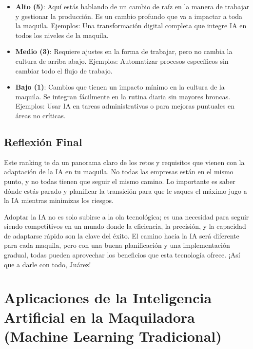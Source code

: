 \documentclass[
  letterpaper,
]{book}
\providecommand{\tightlist}{%
  \setlength{\itemsep}{0pt}\setlength{\parskip}{0pt}}\usepackage{longtable,booktabs,array}
\begin{document}
\begin{enumerate}
  \begin{itemize}
  \tightlist
  \item
    \textbf{Alto (5)}: Aquí estás hablando de un cambio de raíz en la
    manera de trabajar y gestionar la producción. Es un cambio profundo
    que va a impactar a toda la maquila. Ejemplos: Una transformación
    digital completa que integre IA en todos los niveles de la maquila.
  \item
    \textbf{Medio (3)}: Requiere ajustes en la forma de trabajar, pero
    no cambia la cultura de arriba abajo. Ejemplos: Automatizar procesos
    específicos sin cambiar todo el flujo de trabajo.
  \item
    \textbf{Bajo (1)}: Cambios que tienen un impacto mínimo en la
    cultura de la maquila. Se integran fácilmente en la rutina diaria
    sin mayores broncas. Ejemplos: Usar IA en tareas administrativas o
    para mejoras puntuales en áreas no críticas.
  \end{itemize}
\end{enumerate}

\subsection{Reflexión Final}\label{reflexiuxf3n-final-1}

Este ranking te da un panorama claro de los retos y requisitos que
vienen con la adaptación de la IA en tu maquila. No todas las empresas
están en el mismo punto, y no todas tienen que seguir el mismo camino.
Lo importante es saber dónde estás parado y planificar la transición
para que le saques el máximo jugo a la IA mientras minimizas los
riesgos.

Adoptar la IA no es solo subirse a la ola tecnológica; es una necesidad
para seguir siendo competitivos en un mundo donde la eficiencia, la
precisión, y la capacidad de adaptarse rápido son la clave del éxito. El
camino hacia la IA será diferente para cada maquila, pero con una buena
planificación y una implementación gradual, todas pueden aprovechar los
beneficios que esta tecnología ofrece. ¡Así que a darle con todo,
Juárez!

\section{Aplicaciones de la Inteligencia Artificial en la Maquiladora
(Machine Learning
Tradicional)}\label{aplicaciones-de-la-inteligencia-artificial-en-la-maquiladora-machine-learning-tradicional}
\end{document}
